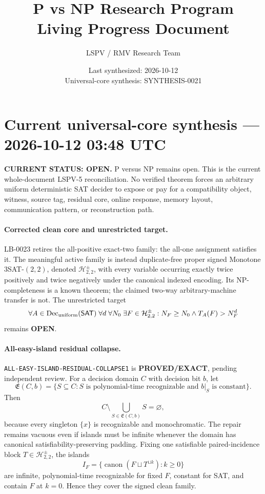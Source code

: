 \documentclass[11pt]{article}
\title{\bfseries P vs NP Research Program\\[0.25em]
\Large Living Progress Document}
\author{LSPV / RMV Research Team}
\date{Last synthesized: 2026-10-12\\ Universal-core synthesis: SYNTHESIS-0021}
\newcommand{\statusproved}{\textcolor{proved}{\textbf{PROVED/EXACT}}}
\newcommand{\statusopen}{\textcolor{openstatus}{\textbf{OPEN}}}
\begin{document}
\section{Current universal-core synthesis --- 2026-10-12 03:48 UTC}

\begin{statusbox}
\textbf{CURRENT STATUS: OPEN.} P versus NP remains open.  This is the current
whole-document LSPV-5 reconciliation.  No verified theorem forces an arbitrary
uniform deterministic SAT decider to expose or pay for a compatibility
object, witness, source tag, residual core, online response, memory layout,
communication pattern, or reconstruction path.
\end{statusbox}

\paragraph{Corrected clean core and unrestricted target.}
LB-0023 retires the all-positive exact-two family: the all-one assignment
satisfies it.  The meaningful active family is instead duplicate-free proper
signed Monotone \(3\)SAT-\((2,2)\), denoted
\(\mathcal H^\pm_{2,2}\), with every variable occurring exactly twice
positively and twice negatively under the canonical indexed encoding.  Its
NP-completeness is a known theorem; the claimed two-way arbitrary-machine
transfer is not.  The unrestricted target
\[
 \forall A\in\operatorname{Dec}_{\rm uniform}(\mathsf{SAT})\;
 \forall d\;\forall N_0\;\exists F\in\mathcal H^\pm_{2,2}:
 N_F\ge N_0\land T_A(F)>N_F^d
\]
remains \statusopen.

\paragraph{All-easy-island residual collapse.}
\texttt{ALL-EASY-ISLAND-RESIDUAL-COLLAPSE1} is \statusproved, pending
independent review.  For a decision domain \(C\) with decision bit \(b\), let
\[
 \mathfrak E(C,b)=\{S\subseteq C:S\text{ is polynomial-time recognizable
 and }b|_S\text{ is constant}\}.
\]
Then
\[
 C\setminus\bigcup_{S\in\mathfrak E(C,b)}S=\varnothing,
\]
because every singleton \(\{x\}\) is recognizable and monochromatic.  The
repair remains vacuous even if islands must be infinite whenever the domain
has canonical satisfiability-preserving padding.  Fixing one satisfiable
paired-incidence block \(T\in\mathcal H^\pm_{2,2}\), the islands
\[
 I_F=\{\operatorname{canon}(F\sqcup T^{\sqcup k}):k\ge0\}
\]
are infinite, polynomial-time recognizable for fixed \(F\), constant for SAT,
and contain \(F\) at \(k=0\).  Hence they cover the signed clean family.
\end{document}
